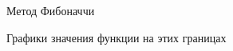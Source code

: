 \documentclass[11pt]{article}
\begin{document}
\begin{figure}[h]
\begin{minipage}[h]{0.47\linewidth}
             Метод Фибоначчи \\
        \end{minipage}
        \caption{Графики значения функции на этих границах}
    \end{figure}
\end{document}
